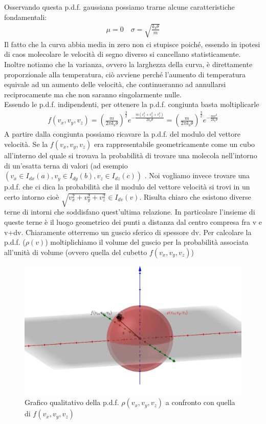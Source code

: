 \documentclass[
10pt, %
a4paper, %
oneside, %
headinclude,footinclude, %
BCOR5mm, %
]{scrartcl}
\begin{document}
Osservando questa p.d.f. gaussiana possiamo trarne alcune caratteristiche fondamentali: 
\begin{align*} 
	\mu = 0 \quad \sigma = \sqrt{\frac{k_b \theta}{m}}
\end{align*} 
Il fatto che la curva abbia media in zero non ci stupisce poiché, essendo in ipotesi di caos molecolare le velocità di segno diverso si cancellano statisticamente. Inoltre notiamo che la varianza, ovvero la larghezza della curva, è direttamente proporzionale alla temperatura, ciò avviene perché l'aumento di temperatura equivale ad un aumento delle velocità, che continueranno ad annullarsi reciprocamente ma che non saranno singolarmente nulle.\\
Essendo le p.d.f. indipendenti, per ottenere la p.d.f. congiunta basta moltiplicarle
\begin{align*} 
	f(v_x, v_y,v_z) = \left(\frac{m}{2\pi k_b\theta}\right)^{\frac{3}{2}} e^{-\frac{m( v_x^2+v_y^2+v_z^2)}{2 k_b \theta}} = \left(\frac{m}{2\pi k_b\theta}\right)^{\frac{3}{2}} e^{-\frac{m v^2}{2 k_b \theta}}
\end{align*} 
A partire dalla congiunta possiamo ricavare la p.d.f. del modulo del vettore velocità. Se la $f(v_x, v_y,v_z)$ era rappresentabile geometricamente come un cubo all'interno del quale si trovava la probabilità di trovare una molecola nell'intorno di un'esatta terna di valori (ad esempio $(v_x \in I_{dx}(a), v_y \in I_{dy}(b), v_z \in I_{dz}(c))$ . Noi vogliamo invece trovare una p.d.f. che ci dica la probabilità che il modulo del vettore velocità si trovi in un certo intorno cioè $ \sqrt{v_x^2+v_y^2+v_z^2} \in I_{dv}(v)$. Risulta chiaro che esistono diverse terne di intorni che soddisfano quest'ultima relazione. In particolare l'insieme di queste terne è il luogo geometrico dei punti a distanza dal centro compresa fra v e v+dv. Chiaramente otterremo un guscio sferico di spessore dv. Per calcolare la p.d.f. ($\rho(v)$) moltiplichiamo il volume del guscio per la probabilità associata all'unità di volume (ovvero quella del cubetto $f(v_x,v_y, v_z)$)
\begin{figure}[h!]
	\centering
	\includegraphics[width=0.7\linewidth]{../images/guscio}
	\caption{Grafico qualitativo della p.d.f. $\rho(v_x,v_y,v_z)$ a confronto con quella di $f(v_x, v_y, v_z)$}
	\label{fig:guscio}
\end{figure}
\end{document}
